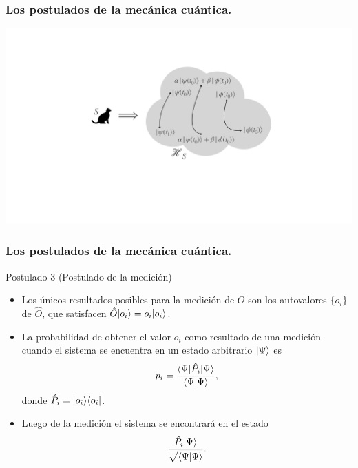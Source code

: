 \documentclass{beamer}
\begin{document}
\begin{frame}
    \frametitle{Los postulados de la mecánica cuántica.}
    \begin{center}
        \includegraphics[scale=0.3]{figs/cats_08.pdf}
    \end{center}

\end{frame}

\begin{frame}
    \frametitle{Los postulados de la mecánica cuántica.}
    
    \begin{block}{Postulado 3 (Postulado de la medición)}
        \begin{itemize}
            \item Los únicos resultados posibles para la medición de $O$ son los autovalores $\{o_i\}$ de $\hat{O}$, que satisfacen $\hat{O}| o_i \rangle=o_i| o_i \rangle$.
            \item La probabilidad de obtener el valor $o_i$ como resultado de una medición cuando el sistema se encuentra en un estado arbitrario $| \Psi \rangle$ es
            \[ p_i = \frac{\langle \Psi |\hat{P}_i| \Psi \rangle}{\langle \Psi | \Psi \rangle},\]
            donde $\hat{P}_i=| o_i \rangle\langle o_i |$.
            \item Luego de la medición el sistema se encontrará en el estado
            \[ \frac{\hat{P}_i| \Psi \rangle}{\sqrt{\langle \Psi | \Psi \rangle}}.\]
        \end{itemize} 
    \end{block}

\end{frame}
\end{document}
